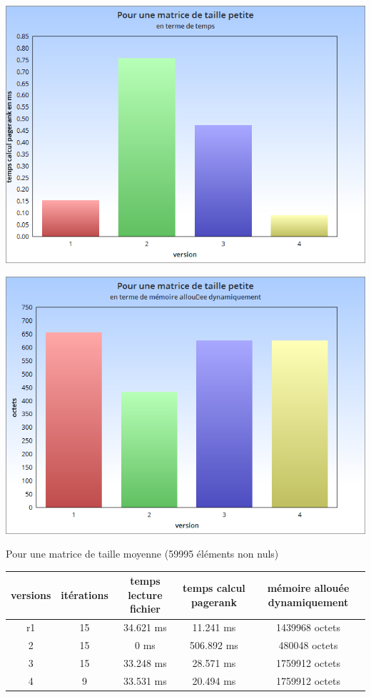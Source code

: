 \documentclass[10pt,a4paper]{article}
\begin{document}
\begin{center}
\includegraphics[scale=0.39]{../histogrammes/matrice_petite_temps.png}
\end{center}
\begin{center}
\includegraphics[scale=0.39]{../histogrammes/matrice_petite_memoire.png}
\end{center}

\begin{center}
Pour une matrice de taille moyenne (59995 éléments non nuls)
\end{center}
\begin{tabular}{| c | c | c | c | c |}
\hline
versions & itérations & temps lecture fichier & temps calcul pagerank & mémoire allouée dynamiquement \\
\hline
r1 & 15 & 34.621 ms & 11.241 ms & 1439968 octets \\
2 & 15 & 0 ms & 506.892 ms & 480048 octets\\
3 & 15 & 33.248 ms & 28.571 ms & 1759912 octets\\
4 & 9 & 33.531 ms & 20.494 ms & 1759912 octets\\
\hline	
\end{tabular}
\end{document}
